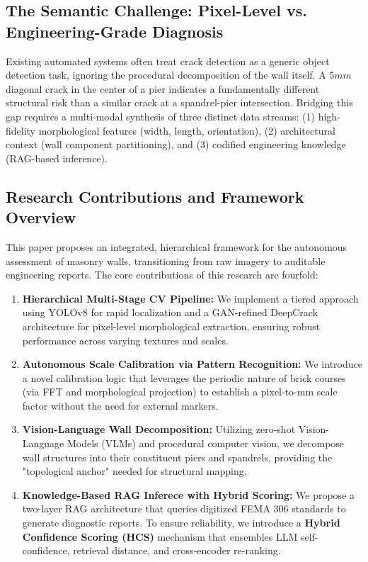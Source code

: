 \subsection{The Semantic Challenge: Pixel-Level vs. Engineering-Grade Diagnosis}
\begin{sloppypar}
Existing automated systems often treat crack detection as a generic object detection task, ignoring the procedural decomposition of the wall itself. A $5mm$ diagonal crack in the center of a pier indicates a fundamentally different structural risk than a similar crack at a spandrel-pier intersection. Bridging this gap requires a multi-modal synthesis of three distinct data streams: (1) high-fidelity morphological features (width, length, orientation), (2) architectural context (wall component partitioning), and (3) codified engineering knowledge (RAG-based inference). 
\end{sloppypar}

\subsection{Research Contributions and Framework Overview}
\begin{sloppypar}
This paper proposes an integrated, hierarchical framework for the autonomous assessment of masonry walls, transitioning from raw imagery to auditable engineering reports. The core contributions of this research are fourfold:
\end{sloppypar}

\begin{enumerate}[noitemsep]
    \item \textbf{Hierarchical Multi-Stage CV Pipeline:} We implement a tiered approach using YOLOv8 for rapid localization and a GAN-refined DeepCrack architecture for pixel-level morphological extraction, ensuring robust performance across varying textures and scales.
    \item \textbf{Autonomous Scale Calibration via Pattern Recognition:} We introduce a novel calibration logic that leverages the periodic nature of brick courses (via FFT and morphological projection) to establish a pixel-to-mm scale factor without the need for external markers.
    \item \textbf{Vision-Language Wall Decomposition:} Utilizing zero-shot Vision-Language Models (VLMs) and procedural computer vision, we decompose wall structures into their constituent piers and spandrels, providing the "topological anchor" needed for structural mapping.
    \item \textbf{Knowledge-Based RAG Inferece with Hybrid Scoring:} We propose a two-layer RAG architecture that queries digitized FEMA 306 standards to generate diagnostic reports. To ensure reliability, we introduce a \textbf{Hybrid Confidence Scoring (HCS)} mechanism that ensembles LLM self-confidence, retrieval distance, and cross-encoder re-ranking.
\end{enumerate}

